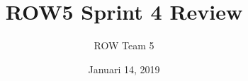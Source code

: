 \documentclass{beamer}
\title[Sprint Review]{ROW5 Sprint 4 Review}
\author{ROW Team 5}
\institute[HvA]
{
	Amsterdam University of Applied Sciences \\
	\textit{https://rescueonwheels.github.io/}
}
\date{Januari 14, 2019}
\begin{document}
	\begin{frame}
		\titlepage
	\end{frame}

	
	
	
	
	
	
	
	
	
	
	
\end{document}
